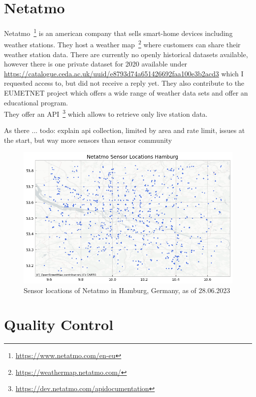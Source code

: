 \section{Netatmo}

Netatmo~\footnote{\url{https://www.netatmo.com/en-eu}} is an american company that sells smart-home devices including weather stations. They host a weather map~\footnote{\url{https://weathermap.netatmo.com/}} where customers can share their weather station data. There are currently no openly historical datasets available, however there is one private dataset for 2020 available under \url{https://catalogue.ceda.ac.uk/uuid/e8793d74a651426692faa100e3b2acd3} which I requested access to, but did not receive a reply yet. %
They also contribute to the EUMETNET project which offers a wide range of weather data sets and offer an educational program.\\ %

They offer an API~\footnote{\url{https://dev.netatmo.com/apidocumentation}} which allows to retrieve only live station data. 

As there ...
todo: explain api collection, limited by area and rate limit, issues at the start, but way more sensors than sensor community

\begin{figure}[ht]
    \centering
    \includegraphics[width=1\textwidth]{images/netatmo_sensor_locations_germany.png}
    \caption{Sensor locations of Netatmo in Hamburg, Germany, as of 28.06.2023}
    \label{fig:netatmo sensor locations germany}
\end{figure}

\section{Quality Control}

